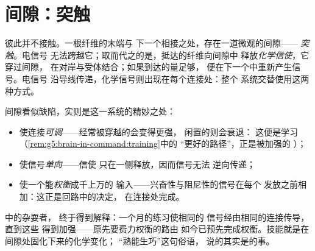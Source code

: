 \section{间隙：突触}

\begin{definition}[突触]\label{def:g8:nervous-communication:synapse}
彼此并不接触。一根纤维的末端与
下一个相接之处，存在一道微观的间隙——
\emph{突触}。电信号
无法跨越它；取而代之的是，抵达的纤维向间隙中
释放\emph{化学信使}，它穿过间隙，
在对岸与受体结合；如果到达的量足够，
便在下一个中重新产生信号。电信号
沿导线传递，化学信号则出现在每个连接处：整个
系统交替使用这两种方式。
\end{definition}

\begin{proposition}[为何是间隙而非焊点]\label{prop:g8:nervous-communication:whygaps}
间隙看似缺陷，实则是这一系统的精妙之处：
\begin{itemize}
  \item 使连接\emph{可调}——经常被穿越的会变得更强，
        闲置的则会衰退：
        这便是学习
        （\cref{rem:g5:brain-in-command:training}中的
        “更好的路径”，正是被加强的
        ）；
  \item 使信号\emph{单向}——信使
        只在一侧释放，因而信号无法
        逆向传递；
  \item 使一个能\emph{权衡}成千上万的
        输入——兴奋性与阻尼性的信号在每个
        发放之前相加：这正是回路中的决定，
        在连接处完成。
\end{itemize}
\end{proposition}
\admitted

\begin{example}[杂耍者的突触]\label{ex:g8:nervous-communication:juggler}
中的杂耍者，
终于得到解释：一个月的练习使相同的
信号经由相同的连接传导，直到这些
得到加强——原先要费力权衡的路由
如今已预先完成权衡。技能就是在间隙处固化下来的化学变化；
“熟能生巧”这句俗语，
说的其实是的事。
\end{example}

